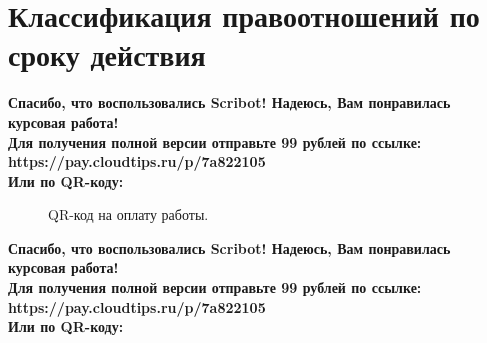 \documentclass{article}
\begin{document}
\section{Классификация правоотношений по сроку действия}
\begin{center}
    \textbf{
        Спасибо, что воспользовались Scribot! Надеюсь, Вам понравилась курсовая работа!\\
        Для получения полной версии отправьте 99 рублей по ссылке:\\
        https://pay.cloudtips.ru/p/7a822105\\
        Или по QR-коду:\\
    }
\end{center}
\begin{figure}[h]
    \caption{QR-код на оплату работы.}
    \label{ris:image}
\end{figure}
\newpage
\begin{center}
    \textbf{
        Спасибо, что воспользовались Scribot! Надеюсь, Вам понравилась курсовая работа!\\
        Для получения полной версии отправьте 99 рублей по ссылке:\\
        https://pay.cloudtips.ru/p/7a822105\\
        Или по QR-коду:\\
    }
\end{center}
\end{document}
